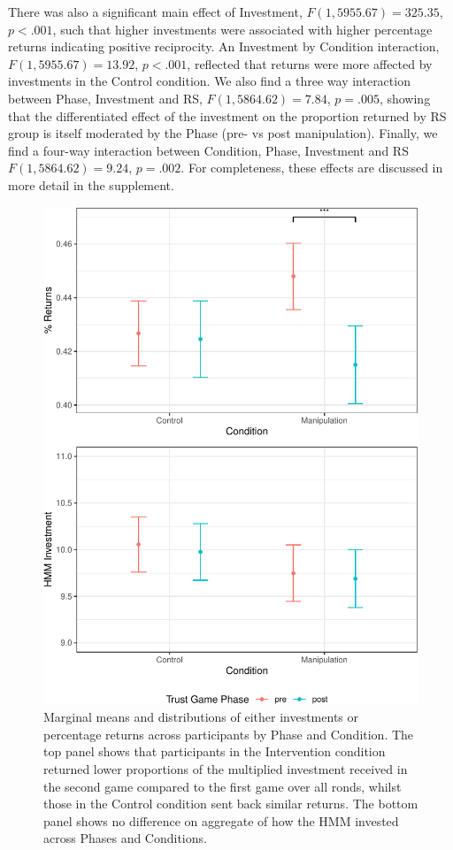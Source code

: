 \documentclass[
]{article}
\begin{document}
There was also a significant main effect of Investment,
\(F(1, 5955.67) = 325.35\), \(p < .001\),
such that higher investments were associated with higher percentage returns indicating positive reciprocity. An Investment by Condition interaction,
\(F(1, 5955.67) = 13.92\), \(p < .001\), reflected that returns were more affected by investments in the Control condition. We also find a three way interaction between Phase, Investment and RS, \(F(1, 5864.62) = 7.84\), \(p = .005\), showing that the differentiated effect of the investment on the proportion returned by RS group is itself moderated by the Phase (pre- vs post manipulation). Finally, we find a four-way interaction between Condition, Phase, Investment and RS \(F(1, 5864.62) = 9.24\), \(p = .002\). For completeness, these effects are discussed in more detail in the supplement.

\begin{figure}

{\centering \includegraphics[width=\textwidth]{article_files/figure-latex/boxPlots-1} 

}

\caption{Marginal means and distributions of either investments or percentage returns across participants by Phase and Condition. The top panel shows that participants in the Intervention condition returned lower proportions of the multiplied investment received in the second game compared to the first game over all ronds, whilst those in the Control condition sent back similar returns. The bottom panel shows no difference on aggregate of how the HMM invested across Phases and Conditions.}\label{fig:boxPlots}
\end{figure}
\end{document}

